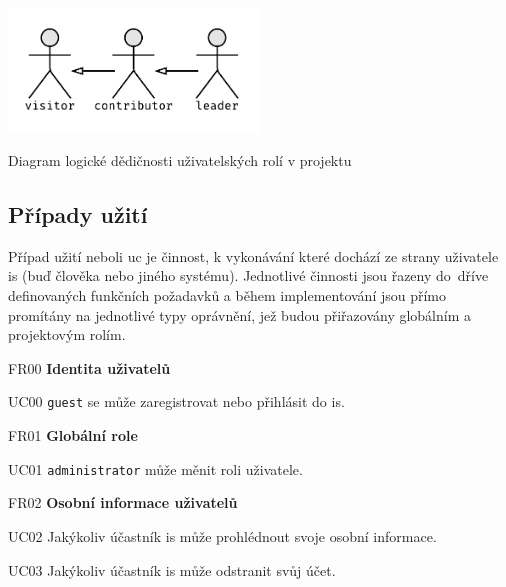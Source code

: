 \begin{fig:illustration}
   \includegraphics[width=0.5\textwidth]{images/dia-actors-project.pdf}
   \caption{Diagram logické dědičnosti uživatelských rolí v projektu}\label{pic:dia-actors-project}
\end{fig:illustration}



\subsection{Případy užití}

Případ užití neboli \gls{uc} je činnost, k vykonávání které dochází ze strany uživatele \gls{is} (buď člověka nebo jiného systému). Jednotlivé činnosti jsou řazeny do~dříve definovaných funkčních požadavků a během implementování jsou přímo promítány na jednotlivé typy oprávnění, jež budou přiřazovány globálním a projektovým rolím.


\begin{dlnar}
   \item[FR00] \textbf{Identita uživatelů}

   \begin{dlnar}
      \item[UC00]
      \texttt{guest} se může zaregistrovat nebo přihlásit do \gls{is}.
   \end{dlnar}
\end{dlnar}



\begin{dlnar}
   \item[FR01] \textbf{Globální role}

   \begin{dlnar}
      \item[UC01] 
      \texttt{administrator} může měnit roli uživatele. 
   \end{dlnar}
\end{dlnar}


\begin{dlnar}
   \item[FR02] \textbf{Osobní informace uživatelů}
 
   \begin{dlnar}
      \item[UC02] 
      Jakýkoliv účastník \gls{is} může prohlédnout svoje osobní informace. 

      \item[UC03] 
      Jakýkoliv účastník \gls{is} může odstranit svůj účet.
   \end{dlnar}
\end{dlnar}


